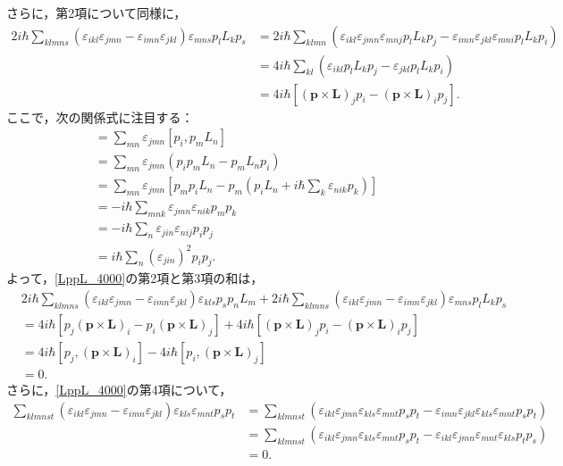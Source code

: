 さらに，第2項について同様に，
\begin{align*}
  2i\hbar\sum_{klmns}(\varepsilon_{ikl}\varepsilon_{jmn} - \varepsilon_{imn}\varepsilon_{jkl})\varepsilon_{mns}p_lL_kp_s
  & = 2i\hbar\sum_{klmn}(\varepsilon_{ikl}\varepsilon_{jmn}\varepsilon_{mnj}p_lL_kp_j - \varepsilon_{imn}\varepsilon_{jkl}\varepsilon_{mni}p_lL_kp_i)\\
  & = 4i\hbar\sum_{kl}(\varepsilon_{ikl}p_lL_kp_j - \varepsilon_{jkl}p_lL_kp_i)\\
  & = 4i\hbar[(\boldsymbol{p}\times\boldsymbol{L})_jp_i - (\boldsymbol{p}\times\boldsymbol{L})_ip_j].
\end{align*}
ここで，次の関係式に注目する：
\begin{align*}
  [p_i,(\boldsymbol{p}\times\boldsymbol{L})_j]
  & = \sum_{mn}\varepsilon_{jmn}[p_i,p_mL_n]\\
  & = \sum_{mn}\varepsilon_{jmn}(p_ip_mL_n - p_mL_np_i)\\
  & = \sum_{mn}\varepsilon_{jmn}\left[p_mp_iL_n - p_m\left(p_iL_n + i\hbar\sum_k\varepsilon_{nik}p_k\right)\right]\\
  & = - i\hbar\sum_{mnk}\varepsilon_{jmn}\varepsilon_{nik}p_mp_k\\
  & = - i\hbar\sum_{n}\varepsilon_{jin}\varepsilon_{nij}p_ip_j\\
  & = i\hbar\sum_n(\varepsilon_{jin})^2p_ip_j.
\end{align*}
よって，\eqref{LppL_4000}の第2項と第3項の和は，
\begin{align*}
  & 2i\hbar\sum_{klmns}(\varepsilon_{ikl}\varepsilon_{jmn} - \varepsilon_{imn}\varepsilon_{jkl})\varepsilon_{kls}p_sp_nL_m + 2i\hbar\sum_{klmns}(\varepsilon_{ikl}\varepsilon_{jmn} - \varepsilon_{imn}\varepsilon_{jkl})\varepsilon_{mns}p_lL_kp_s \\
  & = 4i\hbar[p_j(\boldsymbol{p}\times\boldsymbol{L})_i - p_i(\boldsymbol{p}\times\boldsymbol{L})_j] + 4i\hbar[(\boldsymbol{p}\times\boldsymbol{L})_jp_i - (\boldsymbol{p}\times\boldsymbol{L})_ip_j]\\
  & = 4i\hbar[p_j,(\boldsymbol{p}\times\boldsymbol{L})_i] - 4i\hbar[p_i,(\boldsymbol{p}\times\boldsymbol{L})_j]\\
  & = 0.
\end{align*}
さらに，\eqref{LppL_4000}の第4項について，
\begin{align*}
  \sum_{klmnst}(\varepsilon_{ikl}\varepsilon_{jmn} - \varepsilon_{imn}\varepsilon_{jkl})\varepsilon_{kls}\varepsilon_{mnt}p_sp_t
  & = \sum_{klmnst}(\varepsilon_{ikl}\varepsilon_{jmn}\varepsilon_{kls}\varepsilon_{mnt}p_sp_t - \varepsilon_{imn}\varepsilon_{jkl}\varepsilon_{kls}\varepsilon_{mnt}p_sp_t)\\
  & = \sum_{klmnst}(\varepsilon_{ikl}\varepsilon_{jmn}\varepsilon_{kls}\varepsilon_{mnt}p_sp_t - \varepsilon_{ikl}\varepsilon_{jmn}\varepsilon_{mnt}\varepsilon_{kls}p_tp_s)\\
  & = 0.
\end{align*}
